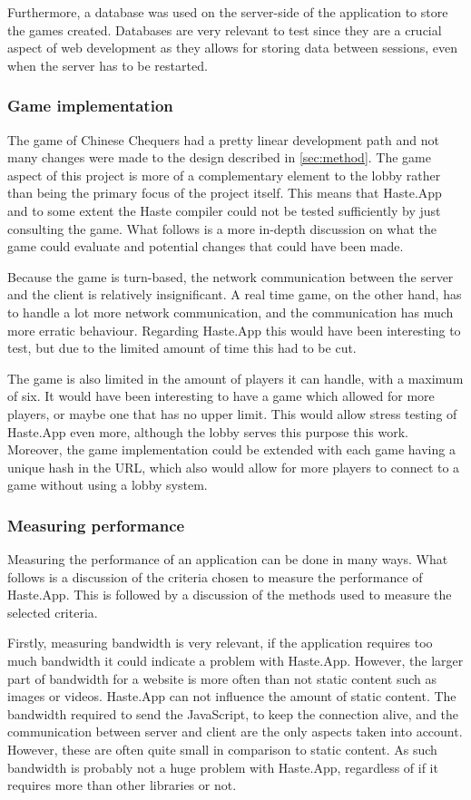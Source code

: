\documentclass[a4paper]{article}
\begin{document}
Furthermore, a database was used on the server-side of the application to store the games created. Databases are very relevant to test since they are a crucial aspect of web development as they allows for storing data between sessions, even when the server has to be restarted.

\subsubsection{Game implementation}
The game of Chinese Chequers had a pretty linear development path and not many changes were made to the design described in \cref{sec:method}. The game aspect of this project is more of a complementary element to the lobby rather than being the primary focus of the project itself. This means that Haste.App and to some extent the Haste compiler could not be tested sufficiently by just consulting the game. What follows is a more in-depth discussion on what the game could evaluate and potential changes that could have been made.


Because the game is turn-based, the network communication between the server and the client is relatively insignificant. A real time game, on the other hand, has to handle a lot more network communication, and the communication has much more erratic behaviour. Regarding Haste.App this would have been interesting to test, but due to the limited amount of time this had to be cut.

The game is also limited in the amount of players it can handle, with a maximum of six. It would have been interesting to have a game which allowed for more players, or maybe one that has no upper limit. This would allow stress testing of Haste.App even more, although the lobby serves this purpose this work. Moreover, the game implementation could be extended with each game having a unique hash in the URL, which also would allow for more players to connect to a game without using a lobby system.


\subsubsection{Measuring performance}
Measuring the performance of an application can be done in many ways. What follows is a discussion of the criteria chosen to measure the performance of Haste.App. This is followed by a discussion of the methods used to measure the selected criteria.

Firstly, measuring bandwidth is very relevant, if the application requires too much bandwidth it could indicate a problem with Haste.App. However, the larger part of bandwidth for a website is more often than not static content such as images or videos. Haste.App can not influence the amount of static content. The bandwidth required to send the JavaScript, to keep the connection alive, and the communication between server and client are the only aspects taken into account. However, these are often quite small in comparison to static content. As such bandwidth is probably not a huge problem with Haste.App, regardless of if it requires more than other libraries or not.
\end{document}
